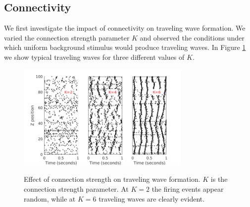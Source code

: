 \documentclass[a4paper,11pt]{article}
\begin{document}
\subsection{Connectivity} \label{sub:connectivity}
We first investigate the impact of connectivity on traveling wave formation.
We varied the connection strength parameter $K$ and observed the conditions under which uniform background stimulus would produce traveling waves.
In Figure \ref{fig:strength_effect} we show typical traveling waves for three different values of $K$.
\begin{figure}[!htb]
 \caption{Effect of connection strength on traveling wave formation. $K$ is the connection strength parameter. At $K=2$ the firing events appear random, while at $K=6$ traveling waves are clearly evident.}
 \centering
   \includegraphics[width=0.75\textwidth]{fig/ConnectionStrengthWaves}  
 \label{fig:strength_effect}
\end{figure}
\end{document}
